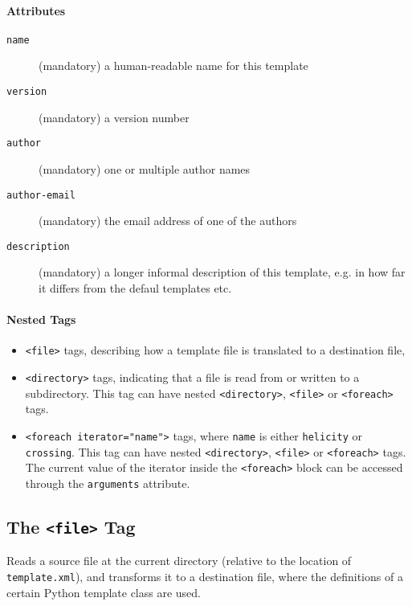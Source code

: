 \documentclass[11pt,a4paper]{refrep}
\begin{document}
\paragraph{Attributes}
\begin{description}
\item[\texttt{name}] (mandatory) a human-readable name for this template
\item[\texttt{version}] (mandatory) a version number
\item[\texttt{author}] (mandatory) one or multiple author names
\item[\texttt{author-email}] (mandatory) the email address of one of the
    authors
\item[\texttt{description}] (mandatory) a longer informal description of
    this template, e.g. in how far it differs from the defaul templates
    etc.
\end{description}

\paragraph{Nested Tags}
\begin{itemize}
\item \texttt{<file>} tags, describing how a template file is translated
   to a destination file,
\item \texttt{<directory>} tags, indicating that a file is read from or
   written to a subdirectory. This tag can have nested
   \texttt{<directory>}, \texttt{<file>} or \texttt{<foreach>} tags.
\item \texttt{<foreach iterator="name">} tags, where \texttt{name} is
   either \texttt{helicity} or \texttt{crossing}. This tag can have nested
   \texttt{<directory>}, \texttt{<file>} or \texttt{<foreach>} tags.
   The current value of the iterator inside the \texttt{<foreach>} block
   can be accessed through the \texttt{arguments} attribute.
\end{itemize}

\subsection{The \texttt{<file>} Tag}
Reads a source file at the current directory (relative to the
location of \texttt{template.xml}), and transforms it to a destination
file, where the definitions of a certain Python template class are used.
\end{document}

